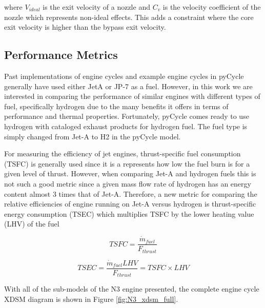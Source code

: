 \documentclass[conf]{new-aiaa}
\begin{document}
\noindent
where $V_{ideal}$ is the exit velocity of a nozzle and $C_v$ is the velocity coefficient of the nozzle which represents non-ideal effects.
This adds a constraint where the core exit velocity is higher than the bypass exit velocity.

\subsection{Performance Metrics}
Past implementations of engine cycles and example engine cycles in pyCycle generally have used either JetA or JP-7 as a fuel.
However, in this work we are interested in comparing the performance of similar engines with different types of fuel, specifically hydrogen due to the many benefits it offers in terms of performance and thermal properties.
Fortunately, pyCycle comes ready to use hydrogen with cataloged exhaust products for hydrogen fuel.
The fuel type is simply changed from Jet-A to H2 in the pyCycle model.

For measuring the efficiency of jet engines, thrust-specific fuel consumption (TSFC) is generally used since it is a represents how low the fuel burn is for a given level of thrust.
However, when comparing Jet-A and hydrogen fuels this is not such a good metric since a given mass flow rate of hydrogen has an energy content almost 3 times that of Jet-A.
Therefore, a new metric for comparing the relative efficiencies of engine running on Jet-A versus hydrogen is thrust-specific energy consumption (TSEC) which multiplies TSFC by the lower heating value (LHV) of the fuel %

\begin{equation}
    TSFC = \frac{\Dot{m}_{fuel}}{F_{thrust}}
\end{equation}

\begin{equation}
    TSEC = \frac{\Dot{m}_{fuel} LHV}{F_{thrust}} = TSFC \times LHV
\end{equation}

With all of the sub-models of the N3 engine presented, the complete engine cycle XDSM diagram is shown in Figure \ref{fig:N3_xdsm_full}.
\end{document}
